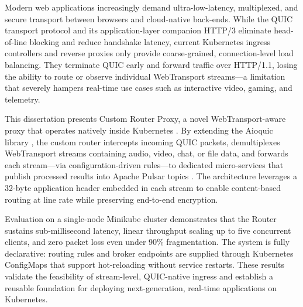 \documentclass[a4paper, 12pt, oneside]{report}         %
\begin{document}

\thesistitlepage                                  %
\setcounter{secnumdepth}{4}
\setcounter{tocdepth}{4}



\begin{thesisabstract}                            %
Modern web applications increasingly demand ultra-low-latency, multiplexed, and secure transport between browsers and cloud-native back-ends. While the QUIC transport protocol \cite{rfc9000} and its application-layer companion HTTP/3 \cite{rfc9114} eliminate head-of-line blocking and reduce handshake latency, current Kubernetes ingress controllers and reverse proxies only provide coarse-grained, connection-level load balancing. They terminate QUIC early and forward traffic over HTTP/1.1, losing the ability to route or observe individual WebTransport streams—a limitation that severely hampers real-time use cases such as interactive video, gaming, and telemetry.

This dissertation presents Custom Router Proxy, a novel WebTransport-aware proxy that operates natively inside Kubernetes \cite{kubernetes-docs}. By extending the Aioquic library \cite{aioquic-repo}, the custom router intercepts incoming QUIC packets, demultiplexes WebTransport streams containing audio, video, chat, or file data, and forwards each stream—via configuration-driven rules—to dedicated micro-services that publish processed results into Apache Pulsar topics \cite{pulsar-helm-repo}. The architecture leverages a 32-byte application header embedded in each stream to enable content-based routing at line rate while preserving end-to-end encryption.

Evaluation on a single-node Minikube cluster \cite{minikube-docs} demonstrates that the Router sustains sub-millisecond latency, linear throughput scaling up to five concurrent clients, and zero packet loss even under 90\% fragmentation. The system is fully declarative: routing rules and broker endpoints are supplied through Kubernetes ConfigMaps that support hot-reloading without service restarts. These results validate the feasibility of stream-level, QUIC-native ingress and establish a reusable foundation for deploying next-generation, real-time applications on Kubernetes.
\end{thesisabstract}
\end{document}
